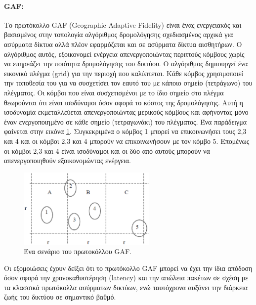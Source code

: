 \paragraph{GAF:} Το πρωτόκολλο GAF (Geographic Adaptive Fidelity) \cite{gaf_protocol} είναι ένας ενεργειακός και βασισμένος στην τοπολογία αλγόριθμος δρομολόγησης
σχεδιασμένος αρχικά για ασύρματα δίκτυα αλλά πλέον εφαρμόζεται και σε ασύρματα δίκτυα αισθητήρων. Ο αλγόριθμος αυτός, εξοικονομεί ενέργεια απενεργοποιώντας περιττούς
κόμβους χωρίς να επηρεάζει την ποιότητα δρομολόγησης του δικτύου. Ο αλγόριθμος δημιουργεί ένα εικονικό πλέγμα (grid) για την περιοχή που καλύπτεται. Κάθε κόμβος
χρησιμοποιεί την τοποθεσία του για να συσχετίσει τον εαυτό του με κάποιο σημείο (τετράγωνο) του πλέγματος. Οι κόμβοι που είναι συσχετισμένοι με το ίδιο σημείο στο
πλέγμα θεωρούνται ότι είναι ισοδύναμοι όσον αφορά το κόστος της δρομολόγησης. Αυτή η ισοδυναμία εκμεταλλεύεται απενεργοποιώντας μερικούς κόμβους και αφήνοντας μόνο
έναν ενεργοποιημένο σε κάθε σημείο (τετραγωνάκι) του πλέγματος. Ένα παράδειγμα φαίνεται στην εικόνα \ref{fig:gaf_example}. Συγκεκριμένα ο κόμβος 1 μπορεί να
επικοινωνήσει τους 2,3 και 4 και οι κόμβοι 2,3 και 4 μπορούν να επικοινωνήσουν με τον κόμβο 5. Επομένως οι κόμβοι 2,3 και 4 είναι ισοδύναμοι και οι δύο από αυτούς
μπορούν να απενεργοποιηθούν εξοικονομώντας ενέργεια.

\begin{figure}[h]
	\centering
	\includegraphics[width=0.6\textwidth]{images/gaf_example.eps}
	\caption{Ένα σενάριο του πρωτοκόλλου GAF.}
	\label{fig:gaf_example}
\end{figure}

Οι εξομοιώσεις έχουν δείξει ότι το πρωτόκολλο GAF μπορεί να έχει την ίδια απόδοση όσον αφορά την χρονοκαθυστέρηση (latency) και την απώλεια πακέτων σε σχέση με τα
κλασσικά πρωτόκολλα ασύρματων δικτύων, ενώ ταυτόχρονα αυξάνει την διάρκεια ζωής του δικτύου σε σημαντικό βαθμό.


